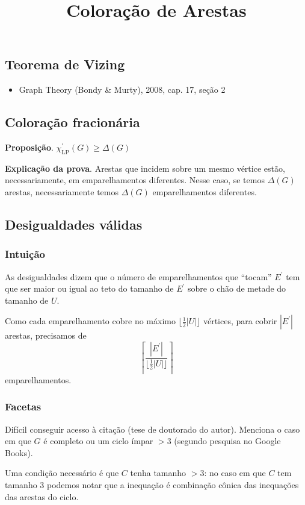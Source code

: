\documentclass[12pt]{article}
\title{Coloração de Arestas}
\begin{document}
    \subsection*{Teorema de Vizing}
    \begin{itemize}
        \item Graph Theory (Bondy \& Murty), 2008, cap. 17, seção 2 
    \end{itemize}

    \subsection*{Coloração fracionária}

        {\bf Proposição}. $\chi^\prime_\mathrm{LP}(G) \geq \Delta(G)$

        \vspace{0.5cm}
        {\bf Explicação da prova}. Arestas que incidem sobre um mesmo vértice estão, necessariamente, em emparelhamentos diferentes. Nesse caso, se temos $\Delta(G)$ arestas, necessariamente temos $\Delta(G)$ emparelhamentos diferentes.

    \subsection*{Desigualdades válidas}

    \subsubsection*{Intuição}
    As desigualdades dizem que o número de emparelhamentos que ``tocam'' $E^\prime$ tem que ser maior ou igual ao teto do tamanho de $E^\prime$ sobre o chão de metade do tamanho de $U$.

    Como cada emparelhamento cobre no máximo $\lfloor \frac{1}{2} |U| \rfloor$ vértices, para cobrir $|E^\prime|$ arestas, precisamos de $$\left\lceil \frac{|E^\prime|}{\lfloor \frac{1}{2} |U| \rfloor}\right\rceil$$
    emparelhamentos.

    \subsubsection*{Facetas}

    Difícil conseguir acesso à citação (tese de doutorado do autor). Menciona o caso em que $G$ é completo ou um ciclo ímpar $> 3$ (segundo pesquisa no Google Books).

    Uma condição necessário é que $C$ tenha tamanho $> 3$: no caso em que $C$ tem tamanho 3 podemos notar que a inequação é combinação cônica das inequações das arestas do ciclo.
\end{document}
